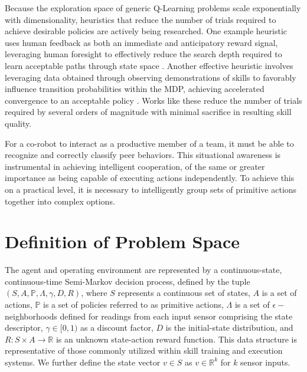 \documentclass[letterpaper]{article}
\begin{document}
  Because the exploration space of generic Q-Learning problems scale exponentially with dimensionality, heuristics that reduce the number of trials required to achieve desirable policies are actively being researched. One example heuristic uses human feedback as both an immediate and anticipatory reward signal, leveraging human foresight to effectively reduce the search depth required to learn acceptable paths through state space \cite{TAMER}. Another effective heuristic involves leveraging data obtained through observing demonstrations of skills to favorably influence transition probabilities within the MDP, achieving accelerated convergence to an acceptable policy \cite{LFDSurvey}. Works like these reduce the number of trials required by several orders of magnitude with minimal sacrifice in resulting skill quality.

  For a co-robot to interact as a productive member of a team, it must be able to recognize and correctly classify peer behaviors. This situational awareness is instrumental in achieving intelligent cooperation, of the same or greater importance as being capable of executing actions independently. To achieve this on a practical level, it is necessary to intelligently group sets of primitive actions together into complex options. 

\section{Definition of Problem Space}
\label{sec:pspace}
  The agent and operating environment are represented by a continuous-state, continuous-time Semi-Markov decision process, defined by the tuple $(S,A,\mathbb{P},\Lambda,\gamma,D,R)$, where $S$ represents a continuous set of states, $A$ is a set of actions, $\mathbb{P}$ is a set of policies referred to as primitive actions, $\Lambda$ is a set of $\epsilon-$neighborhoods defined for readings from each input sensor comprising the state descriptor, $\gamma \in [0,1)$ as a discount factor, $D$ is the initial-state distribution, and $R : S \times A \rightarrow \mathbb{R}$ is an unknown state-action reward function. This data structure is representative of those commonly utilized within skill training and execution systems. We further define the state vector $v \in S$ as $v \in \mathbb{R}^k$ for $k$ sensor inputs.
\end{document}
